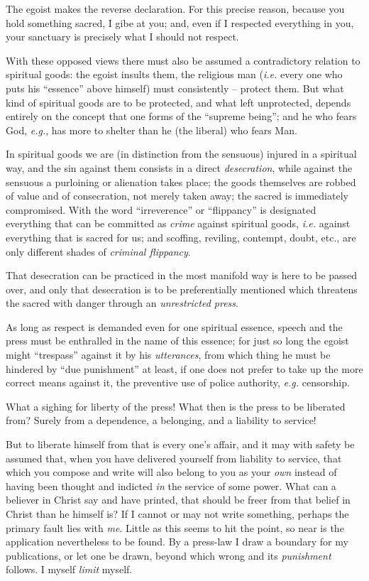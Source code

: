 The egoist makes the reverse declaration. For this precise reason, because you 
hold something sacred, I gibe at you; and, even if I respected everything in 
you, your sanctuary is precisely what I should not respect.

With these opposed views there must also be assumed a contradictory relation 
to spiritual goods: the egoist insults them, the religious man (\textit{i.e.} 
every one who puts his ``essence'' above himself) must consistently -- 
protect them. But what kind of spiritual goods are to be protected, and what 
left unprotected, depends entirely on the concept that one forms of the 
``supreme being''; and he who fears God, \textit{e.g.}, has more to shelter 
than he (the liberal) who fears Man.

In spiritual goods we are (in distinction from the sensuous) injured in a 
spiritual way, and the sin against them consists in a direct 
\textit{desecration}, while against the sensuous a purloining or alienation 
takes place; the goods themselves are robbed of value and of consecration, not 
merely taken away; the sacred is immediately compromised. With the word 
``irreverence'' or ``flippancy'' is designated everything that can be 
committed as \textit{crime} against spiritual goods, \textit{i.e.} against 
everything that is sacred for us; and scoffing, reviling, contempt, doubt, 
etc., are only different shades of \textit{criminal flippancy}.

That desecration can be practiced in the most manifold way is here to be 
passed over, and only that desecration is to be preferentially mentioned which 
threatens the sacred with danger through an \textit{unrestricted press}.

As long as respect is demanded even for one spiritual essence, speech and the 
press must be enthralled in the name of this essence; for just so long the 
egoist might ``trespass'' against it by his \textit{utterances}, from which 
thing he must be hindered by ``due punishment'' at least, if one does not 
prefer to take up the more correct means against it, the preventive use of 
police authority, \textit{e.g.} censorship.

What a sighing for liberty of the press! What then is the press to be 
liberated from? Surely from a dependence, a belonging, and a liability to 
service!

But to liberate himself from that is every one's affair, and it may with 
safety be assumed that, when you have delivered yourself from liability to 
service, that which you compose and write will also belong to you as your 
\textit{own} instead of having been thought and indicted \textit{in} the 
service of some power. What can a believer in Christ say and have printed, 
that should be freer from that belief in Christ than he himself is? If I 
cannot or may not write something, perhaps the primary fault lies with 
\textit{me}. Little as this seems to hit the point, so near is the application 
nevertheless to be found. By a press-law I draw a boundary for my 
publications, or let one be drawn, beyond which wrong and its 
\textit{punishment} follows. I myself \textit{limit} myself.

